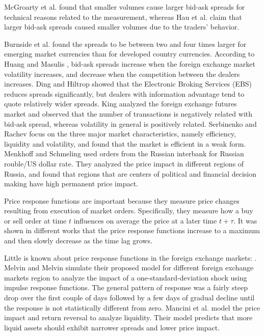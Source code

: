 McGroarty et al. \cite{micro_eff} found that smaller volumes cause larger
bid-ask spreads for technical reasons related to the measurement, whereas Hau
et al. \cite{eur_change_forex,eur_int_curr} claim that larger bid-ask spreads
caused smaller volumes due to the traders' behavior.

Burnside et al. \cite{curr_speculation} found the spreads to be between two and
four times larger for emerging market currencies than for developed country
currencies. According to Huang and Masulis \cite{spread_competition}, bid-ask
spreads increase when the foreign exchange market volatility increases, and
decrease when the competition between the dealers increases. Ding and Hiltrop
\cite{electronic_forex} showed that the Electronic Broking Services (EBS)
reduces spreads significantly, but dealers with information advantage tend to
quote relatively wider spreads. King \cite{spread_futures} analyzed the foreign
exchange futures market and observed that the number of transactions is
negatively related with bid-ask spread, whereas volatility in general is
positively related. Serbinenko and Rachev \cite{intraday_forex} focus on the
three major market characteristics, namely efficiency, liquidity and
volatility, and found that the market is efficient in a weak form. Menkhoff and
Schmeling \cite{local_forex} used orders from the Russian interbank for Russian
rouble/US dollar rate. They analyzed the price impact in different regions of
Russia, and found that regions that are centers of political and financial
decision making have high permanent price impact.

Price response functions are important because they measure price changes
resulting from execution of market orders. Specifically, they measure how a buy
or sell order at time $t$ influences on average the price at a later time
$t + \tau$. It was shown in different works
\cite{components_spread_tokyo,dissecting_cross,r_walks_liquidity,subtle_nature,Bouchaud_2004,theory_market_impact,my_paper_response_financial,Wang_2016_avg,Wang_2016_cross}
that the price response functions increase to a maximum and then slowly
decrease as the time lag grows.

Little is known about price response functions in the foreign exchange markets:
\cite{forex_liquidity,forex_volatility,response_funct_fx}. Melvin and Melvin
\cite{forex_volatility} simulate their proposed model for different foreign
exchange markets region to analyze the impact of a one-standard-deviation shock
using impulse response functions. The general pattern of response was a fairly
steep drop over the first couple of days followed by a few days of gradual
decline until the response is not statistically different from zero. Mancini et
al. \cite{forex_liquidity} model the price impact and return reversal to
analyze liquidity. Their model predicts that more liquid assets should exhibit
narrower spreads and lower price impact.

